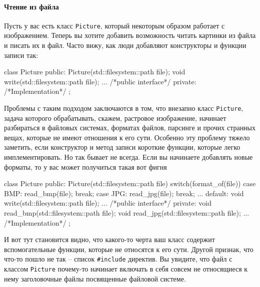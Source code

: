 \paragraph{Чтение из файла}

Пусть у вас есть класс \verb"Picture", который некоторым образом работает с изображением.
Теперь вы хотите добавить возможность читать картинки из файла и писать их в файл.
Часто вижу, как люди добавляют конструкторы и функции записи так:
\begin{cppcode}
class Picture {
public:
  Picture(std::filesystem::path file);
  void write(std::filesystem::path file);
  ...
  /*public interface*/
private:
  /*Implementation*/
};
\end{cppcode}
Проблемы с таким подходом заключаются в том, что внезапно класс \verb"Picture", задача которого обрабатывать, скажем, растровое изображение, начинает разбираться в файловых системах, форматах файлов, парсинге и прочих странных вещах, которые не имеют отношения к его сути.
Особенно эту проблему тяжело заметить, если конструктор и метод записи короткие функции, которые легко имплементировать.
Но так бывает не всегда.
Если вы начинаете добавлять новые форматы, то у вас может получиться такая вот фигня
\begin{cppcode}
class Picture {
public:
  Picture(std::filesystem::path file) {
    switch(format_of(file)) {
      case BMP:
        read_bmp(file);
        break;
      case JPG:
        read_jpg(file);
        break;
        ...
      default:
    }
  }
  void write(std::filesystem::path file);
  ...
  /*public interface*/
private:
  void read_bmp(std::filesystem::path file);
  void read_jpg(std::filesystem::path file);
  ...
  /*Implementation*/
};
\end{cppcode}
И вот тут становится видно, что какого-то черта ваш класс содержит вспомогательные функции, которые не относятся к его сути.
Другой признак, что что-то пошло не так -- список \verb"#include" директив.
Вы увидите, что файл с классом \verb"Picture" почему-то начинает включать в себя совсем не относящиеся к нему заголовочные файлы посвященные файловой системе.

